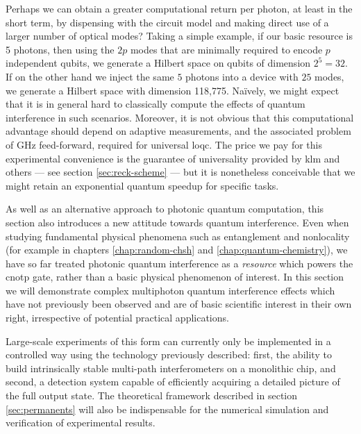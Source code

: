 Perhaps we can obtain a greater computational return per photon, at least in the short term, by dispensing with the circuit model and making direct use of a larger number of optical modes?  Taking a simple example, if our basic resource is 5 photons, then using the $2p$ modes that are minimally required to encode $p$ independent qubits, we generate a Hilbert space on qubits of dimension $2^5 = 32$. If on the other hand we inject the same $5$ photons into a device with $25$ modes, we generate a Hilbert space with dimension 118,775. Na\"ively, we might expect that it is in general hard to classically compute the effects of quantum interference in such scenarios. Moreover, it is not obvious that this computational advantage should depend on adaptive measurements, and the associated problem of GHz feed-forward, required for universal \gls{loqc}.  The price we pay for this experimental convenience is the guarantee of universality provided by \gls{klm} and others --- see section \ref{sec:reck-scheme} --- but it is nonetheless conceivable that we might retain an exponential quantum speedup for specific tasks.

As well as an alternative approach to photonic quantum computation, this section also introduces a new attitude towards quantum interference.  Even when studying fundamental physical phenomena such as entanglement and nonlocality (for example in chapters \ref{chap:random-chsh} and \ref{chap:quantum-chemistry}), we have so far treated photonic quantum interference as a \emph{resource} which powers the \acrshort{cnotp} gate, rather than a basic physical phenomenon of interest. In this section we will demonstrate complex multiphoton quantum interference effects which have not previously been observed and are of basic scientific interest in their own right, irrespective of potential practical applications.

Large-scale experiments of this form can currently only be implemented in a controlled way using the technology previously described: first, the ability to build intrinsically stable multi-path interferometers on a monolithic chip, and second, a detection system capable of efficiently acquiring a detailed picture of the full output state. The theoretical framework described in section \ref{sec:permanents} will also be indispensable for the numerical simulation and verification of experimental results.

